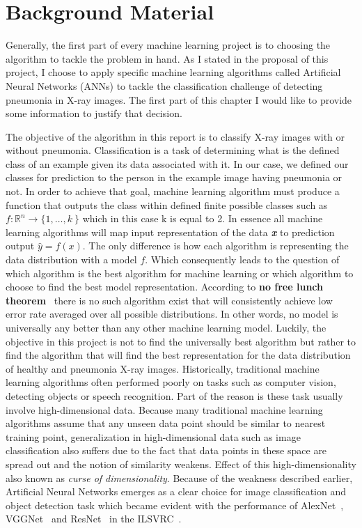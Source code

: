 \chapter{Background Material}
Generally, the first part of every machine learning project is to choosing the algorithm to tackle the problem in hand. As I stated in the proposal of this project, I choose to apply specific machine learning algorithms called Artificial Neural Networks (ANNs) to tackle the classification challenge of detecting pneumonia in X-ray images. The first part of this chapter I would like to provide some information to justify that decision. 

The objective of the algorithm in this report is to classify X-ray images with or without pneumonia. Classification is a task of determining what is the defined class of an example given its data associated with it. In our case, we defined our classes for prediction to the person in the example image having pneumonia or not. In order to achieve that goal, machine learning algorithm must produce a function that outputs the class within defined finite possible classes such as \(f:\mathbb{R}^n \rightarrow \{1, \ldots, k\ \}\) which in this case k is equal to 2. In essence all machine learning algorithms will map input representation of the data \textbf{\textit{x}} to prediction output $\hat{y}=f(x)$. The only difference is how each algorithm is representing the data distribution with a model $f$. Which consequently leads to the question of which algorithm is the best algorithm for machine learning or which algorithm to choose to find the best model representation. According to \textbf{no free lunch theorem}~\cite{nofreelunch} there is no such algorithm exist that will consistently achieve low error rate averaged over all possible distributions. In other words, no model is universally any better than any other machine learning model. Luckily, the objective in this project is not to find the universally best algorithm but rather to find the algorithm that will find the best representation for the data distribution of healthy and pneumonia X-ray images. 
Historically, traditional machine learning algorithms often performed poorly on tasks such as computer vision, detecting objects or speech recognition. Part of the reason is these task usually involve high-dimensional data. Because many traditional machine learning algorithms assume that any unseen data point should be similar to nearest training point, generalization in high-dimensional data such as image classification also suffers due to the fact that data points in these space are spread out and the notion of similarity weakens. Effect of this high-dimensionality also known as \emph{curse of dimensionality}.
Because of the weakness described earlier, Artificial Neural Networks emerges as a clear choice for image classification and object detection task which became evident with the performance of AlexNet~\cite{Alexnet}, VGGNet~\cite{vggnet} and ResNet~\cite{resnet} in the ILSVRC~\cite{imagenet}.  


